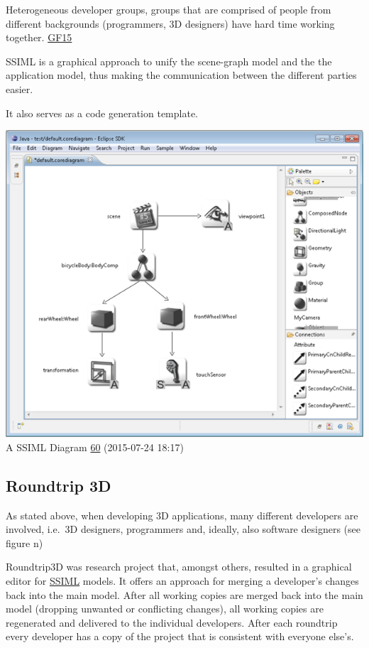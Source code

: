 Heterogeneous developer groups, groups that are comprised of people from
different backgrounds (programmers, 3D designers) have hard time working
together. \href{http://dx.doi.org/10.1007/s00450-014-0256-x}{GF15}

SSIML is a graphical approach to unify the scene-graph model and the the
application model, thus making the communication between the different
parties easier.

It also serves as a code generation template.

\includegraphics{../assets/SSIML.png}\\
A SSIML Diagram \href{http://vr.tu-freiberg.de/roundtrip3d/}{60}
(2015-07-24 18:17)

\subsection{Roundtrip 3D}\label{roundtrip-3d}

As stated above, when developing 3D applications, many different
developers are involved, i.e.~3D designers, programmers and, ideally,
also software designers (see figure n)


Roundtrip3D was research project that, amongst others, resulted in a
graphical editor for \hyperref[ssiml]{SSIML} models. It offers an
approach for merging a developer's changes back into the main model.
After all working copies are merged back into the main model (dropping
unwanted or conflicting changes), all working copies are regenerated and
delivered to the individual developers. After each roundtrip every
developer has a copy of the project that is consistent with everyone
else's.

